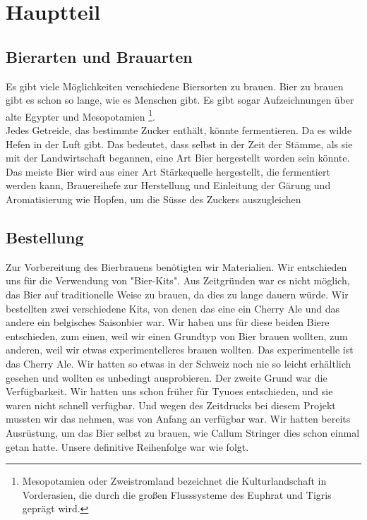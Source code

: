 \newpage
\section{Hauptteil}
\subsection{Bierarten und Brauarten}
Es gibt viele Möglichkeiten verschiedene Biersorten zu brauen.
Bier zu brauen gibt es schon so lange, wie es Menschen gibt. Es gibt sogar Aufzeichnungen über alte Egypter und Mesopotamien \footnote{
	Mesopotamien oder Zweistromland bezeichnet die Kulturlandschaft in Vorderasien, die durch die großen Flusssysteme des Euphrat und Tigris geprägt wird.\cite{wiki.brewing}
}.\\
Jedes Getreide, das bestimmte Zucker enthält, könnte fermentieren. Da es wilde Hefen in der Luft gibt.
Das bedeutet, dass selbst in der Zeit der Stämme, als sie mit der Landwirtschaft begannen, eine Art Bier hergestellt worden sein könnte.\\
Das meiste Bier wird aus einer Art Stärkequelle hergestellt, die fermentiert werden kann, Brauereihefe zur Herstellung und Einleitung der
Gärung und Aromatisierung wie Hopfen, um die Süsse des Zuckers auszugleichen

\subsection{Bestellung}
Zur Vorbereitung des Bierbrauens benötigten wir Materialien.
Wir entschieden uns für die Verwendung von "Bier-Kits". Aus Zeitgründen war es nicht möglich,
das Bier auf traditionelle Weise zu brauen, da dies zu lange dauern würde.
Wir bestellten zwei verschiedene Kits, von denen das eine ein Cherry Ale und das andere ein belgisches Saisonbier war.
Wir haben uns für diese beiden Biere entschieden, zum einen, weil wir einen Grundtyp von Bier brauen wollten, zum anderen, weil wir etwas experimentelleres brauen wollten.  Das experimentelle ist das Cherry Ale. Wir hatten so etwas in der Schweiz noch nie so leicht erhältlich gesehen und wollten es unbedingt ausprobieren.
Der zweite Grund war die Verfügbarkeit. Wir hatten uns schon früher für Tyuoes entschieden, und sie waren nicht schnell verfügbar. Und wegen des Zeitdrucks bei diesem Projekt mussten wir das nehmen, was von Anfang an verfügbar war.
\newpage
Wir hatten bereits Ausrüstung, um das Bier selbst zu brauen, wie Callum Stringer dies schon einmal getan hatte.
Unsere definitive Reihenfolge war wie folgt.

